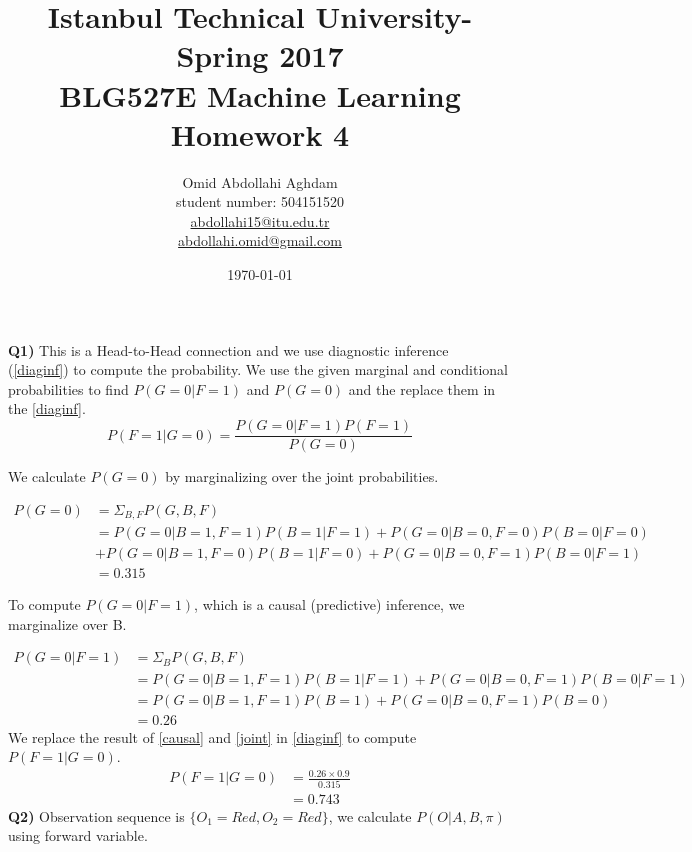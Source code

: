 \documentclass[12pt]{article}
\begin{document}
\title{Istanbul Technical University- Spring 2017 \\ BLG527E Machine Learning \\ Homework 4}
\author{Omid Abdollahi Aghdam \\
student number: 504151520\\
\href{mailto:abdollahi15@itu.edu.tr}{abdollahi15@itu.edu.tr}\\
\href{mailto:abdollahi.omid@gmail.com}{abdollahi.omid@gmail.com}
}
\date{\today}
\maketitle
\newpage
\textbf{Q1)} This is a Head-to-Head connection and we use diagnostic inference (\ref{diaginf}) to compute the probability. We use the given marginal and conditional probabilities to find $P(G=0 | F=1)$ and $P(G=0)$ and the replace them in the \ref{diaginf}.\\

\begin{equation}\label{diaginf}
	P(F=1 | G =0) = \frac{P(G=0 | F=1)P(F=1)}{P(G=0)}
\end{equation}

We calculate $P(G=0)$ by marginalizing over the joint probabilities.

\begin{equation}\label{joint}
	\begin{aligned}
		P(G=0) &= \Sigma_{B,F} P(G,B,F)\\
		&= P(G=0 | B=1, F=1)P(B=1|F=1) + P(G=0 | B=0, F=0)P(B=0|F=0)\\
		&+ P(G=0 | B=1, F=0)P(B=1|F=0) + P(G=0 | B=0, F=1)P(B=0|F=1) \\
		&= 0.315
	\end{aligned}
\end{equation}

To compute $P(G=0 | F=1)$, which is a causal (predictive) inference, we marginalize over B.

\begin{equation}\label{causal}
	\begin{aligned}
		P(G=0 | F=1) &= \Sigma_{B} P(G,B,F)\\
		&= P(G=0 | B=1, F=1)P(B=1|F=1) + P(G=0 | B=0, F=1)P(B=0|F=1)\\
		&= P(G=0 | B=1, F=1)P(B=1) + P(G=0 | B=0, F=1)P(B=0)\\
		&= 0.26
	\end{aligned}
\end{equation}
We replace the result of \ref{causal} and \ref{joint} in \ref{diaginf} to compute $P(F=1 | G =0)$.
\begin{equation}
	\begin{aligned}
		P(F=1 | G =0) &= \frac{0.26 \times 0.9}{0.315}\\
		&= 0.743
	\end{aligned}
\end{equation}
\textbf{Q2)} Observation sequence is $\{O_1 = Red, O_2=Red\}$, we calculate $P(O | A, B, \pi)$ using forward variable.\\
\end{document}
